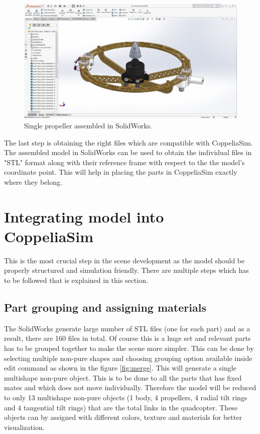 \documentclass[a4paper, 12pt, oneside]{book}
\begin{document}
\begin{figure}[H]
    \begin{center}
        \includegraphics[width=.8\linewidth]{figures/individualAssem.JPG}
        \caption{Single propeller assembled in SolidWorks.}
        \label{fig:solidworksPart}
    \end{center}
\end{figure}

The last step is obtaining the right files which are compatible with CoppeliaSim. The assembled model in SolidWorks can be used to obtain the individual files in "STL" format along with their reference frame with respect to the the model's coordinate point. This will help in placing the parts in CoppeliaSim exactly where they belong.

\section{Integrating model into CoppeliaSim}
This is the most crucial step in the scene development as the model should be properly structured and simulation friendly. There are multiple steps which has to be followed that is explained in this section.

\subsection{Part grouping and assigning materials}
The SolidWorks generate large number of STL files (one for each part) and as a result, there are 160 files in total. Of course this is a huge set and relevant parts has to be grouped together to make the scene more simpler. This can be done by selecting multiple non-pure shapes and choosing grouping option available inside edit command as shown in the figure \ref{fig:merge}. This will generate a single multishape non-pure object. This is to be done to all the parts that has fixed mates and which does not move individually. Therefore the model will be reduced to only 13 multishape non-pure objects (1 body, 4 propellers, 4 radial tilt rings and 4 tangential tilt rings) that are the total links in the quadcopter. These objects can by assigned with different colors, texture and materials for better visualization.  
\end{document}
